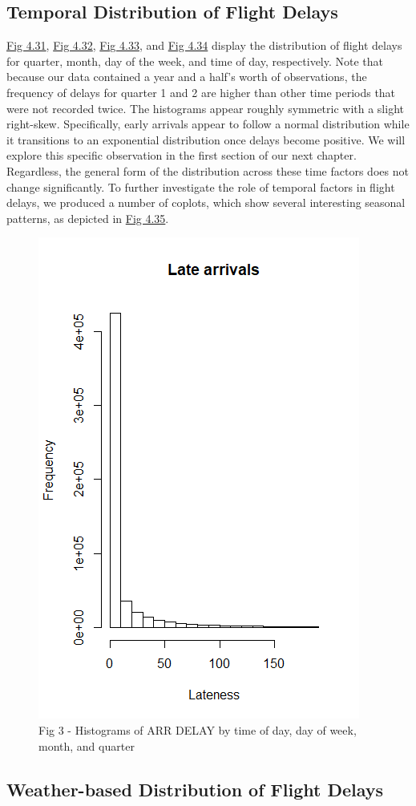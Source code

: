 \documentclass[12pt, a4paper, openany]{book}
\newcommand\tab[1][1cm]{\hspace*{#1}}
\begin{document}
		\subsection{Temporal Distribution of Flight Delays}
		
			\tab \underline{Fig 4.31}, \underline{Fig 4.32}, \underline{Fig 4.33}, and \underline{Fig 4.34} display the distribution of flight delays for quarter, month, day of the week, and time of day, respectively. Note that because our data contained a year and a half’s worth of observations, the frequency of delays for quarter 1 and 2 are higher than other time periods that were not recorded twice. The histograms appear roughly symmetric with a slight right-skew. Specifically, early arrivals appear to follow a normal distribution while it transitions to an exponential distribution once delays become positive. We will explore this specific observation in the first section of our next chapter. Regardless, the general form of the distribution across these time factors does not change significantly. To further investigate the role of temporal factors in flight delays, we produced a number of coplots, which show several interesting seasonal patterns, as depicted in \underline{Fig 4.35}.\\
			\begin{figure}
			\centering
	 		\includegraphics[width = .45 \textwidth]{../figures/LateArrivalsHistogram}
	 		\caption{Fig 3 - Histograms of ARR DELAY by time of day, day of week, month, and quarter}
	 		\end{figure}
	 		
		\subsection{Weather-based Distribution of Flight Delays}
		
\end{document}
